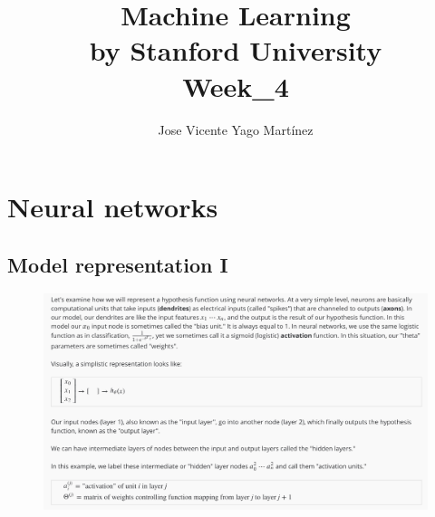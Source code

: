 \documentclass[12pt, A4,onecolumn]{article} %
\title{\textbf{Machine Learning\\ 
\small{by Stanford University}\\
Week\_4
}}
\author{
Jose Vicente Yago Martínez
}%
\begin{document}
\maketitle

	





\newpage
\tableofcontents

\newpage


\section{Neural networks}
\subsection{Model representation I}

\begin{figure}[H]
	\centering
	\includegraphics[width=1\textwidth]{./ImagenesW4/modelRep1}
\end{figure}
\end{document}

